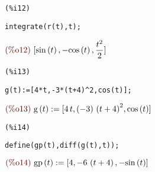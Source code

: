 \documentclass[12pt]{article}
\begin{document}
\noindent
\begin{minipage}[t]{8ex}{\color{red}\bf
\begin{verbatim}
(%i12) 
\end{verbatim}}
\end{minipage}
\begin{minipage}[t]{\textwidth}{\color{blue}
\begin{verbatim}
integrate(r(t),t);
\end{verbatim}}
\end{minipage}
\begin{math}\displaystyle
\parbox{8ex}{\color{labelcolor}(\%o12) }
[\mathrm{sin}\left( t\right) ,-\mathrm{cos}\left( t\right) ,\frac{{t}^{2}}{2}]
\end{math}


\noindent
\begin{minipage}[t]{8ex}{\color{red}\bf
\begin{verbatim}
(%i13) 
\end{verbatim}}
\end{minipage}
\begin{minipage}[t]{\textwidth}{\color{blue}
\begin{verbatim}
g(t):=[4*t,-3*(t+4)^2,cos(t)];
\end{verbatim}}
\end{minipage}
\begin{math}\displaystyle
\parbox{8ex}{\color{labelcolor}(\%o13) }
\mathrm{g}\left( t\right) :=[4\,t,\left( -3\right) \,{\left( t+4\right) }^{2},\mathrm{cos}\left( t\right) ]
\end{math}


\noindent
\begin{minipage}[t]{8ex}{\color{red}\bf
\begin{verbatim}
(%i14) 
\end{verbatim}}
\end{minipage}
\begin{minipage}[t]{\textwidth}{\color{blue}
\begin{verbatim}
define(gp(t),diff(g(t),t));
\end{verbatim}}
\end{minipage}
\begin{math}\displaystyle
\parbox{8ex}{\color{labelcolor}(\%o14) }
\mathrm{gp}\left( t\right) :=[4,-6\,\left( t+4\right) ,-\mathrm{sin}\left( t\right) ]
\end{math}
\end{document}
